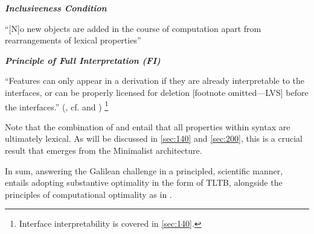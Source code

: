 \begin{examples}
    \item\label{def:inclusiveness}
        \textbf{\textit{Inclusiveness Condition}}

        ``[N]o new objects are added in the course of computation apart from rearrangements of lexical properties'' \parencite[228]{ChomskyN_1995}

    \item\label{def:FI}
        \textbf{\textit{Principle of Full Interpretation (FI)}}

        ``Features can only appear in a derivation if they are already interpretable to the interfaces, or can be properly licensed for deletion [footnote omitted---LVS] before the interfaces.'' (, cf.  and )%
        \footnote{Interface interpretability is covered in \autoref{sec:140}.}
\end{examples}
\noindent
Note that the combination of  and  entail that all properties within syntax are ultimately lexical. As will be discussed in \autoref{sec:140} and \autoref{sec:200}, this is a crucial result that emerges from the Minimalist architecture.

In sum, answering the Galilean challenge in a principled, scientific manner, entails adopting substantive optimality in the form of TLTB, alongside the principles of computational optimality as in .

